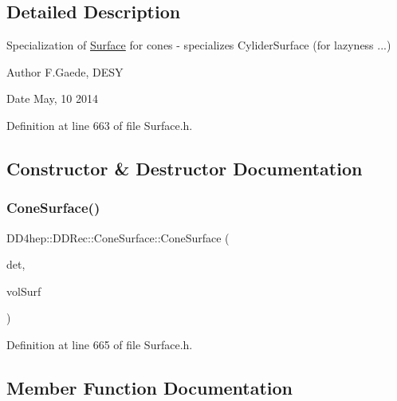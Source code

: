 \subsection{Detailed Description}
Specialization of \hyperlink{class_d_d4hep_1_1_d_d_rec_1_1_surface}{Surface} for cones -\/ specializes Cylider\+Surface (for lazyness ...) \begin{DoxyAuthor}{Author}
F.\+Gaede, D\+E\+SY 
\end{DoxyAuthor}
\begin{DoxyDate}{Date}
May, 10 2014 
\end{DoxyDate}


Definition at line 663 of file Surface.\+h.



\subsection{Constructor \& Destructor Documentation}
\hypertarget{class_d_d4hep_1_1_d_d_rec_1_1_cone_surface_ac1cbae9a5b60607333e532ffff9fb998}{}\label{class_d_d4hep_1_1_d_d_rec_1_1_cone_surface_ac1cbae9a5b60607333e532ffff9fb998} 
\subsubsection{\texorpdfstring{Cone\+Surface()}{ConeSurface()}}
{\footnotesize\ttfamily D\+D4hep\+::\+D\+D\+Rec\+::\+Cone\+Surface\+::\+Cone\+Surface (\begin{DoxyParamCaption}\item[{\hyperlink{class_d_d4hep_1_1_geometry_1_1_det_element}{Geometry\+::\+Det\+Element}}]{det,  }\item[{\hyperlink{class_d_d4hep_1_1_d_d_rec_1_1_vol_surface}{Vol\+Surface}}]{vol\+Surf }\end{DoxyParamCaption})\hspace{0.3cm}{\ttfamily [inline]}}



Definition at line 665 of file Surface.\+h.



\subsection{Member Function Documentation}
\hypertarget{class_d_d4hep_1_1_d_d_rec_1_1_cone_surface_ad3fe5b411845bd6985c049e703351843}{}\label{class_d_d4hep_1_1_d_d_rec_1_1_cone_surface_ad3fe5b411845bd6985c049e703351843} 
